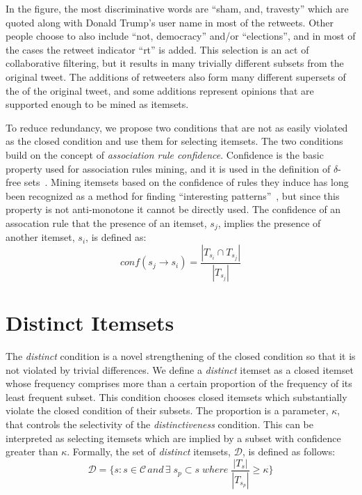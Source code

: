 \documentclass[letterpaper,12pt,titlepage,oneside,final]{book}
\begin{document}
In the figure, the most discriminative words are ``sham, and, travesty''
which are quoted along with Donald Trump's user name in most of the retweets.
Other people choose to also include ``not, democracy'' and/or ``elections'',
and in most of the cases the retweet indicator ``rt'' is added. 
This selection is an act of collaborative filtering,
but it results in many trivially different subsets from the original tweet.
The additions of retweeters also form many different supersets of the of the
original tweet, and some additions represent opinions that are supported
enough to be mined as itemsets. 

To reduce redundancy, we propose two conditions that are not as easily violated 
as the closed condition and use them for selecting itemsets.
The two conditions build on the concept of \emph{association rule confidence}.
Confidence is the basic property used for association rules mining,
and it is used in the definition of $\delta$-free sets~\cite{boulicaut2003free}.
Mining itemsets based on the confidence of rules they induce has long been
recognized as a method for finding
``interesting patterns''~\cite{cohen2001finding},
but since this property is not anti-monotone it cannot be directly used.
The confidence of an assocation rule that the presence of an itemset,
$s_{j}$, implies the presence of another itemset, $s_i$, is  defined as:
\begin{equation}\label{eq:conf}conf(s_j \rightarrow s_i) = \frac{|T_{s_i} \cap T_{s_j}|}{|T_{s_j}|}\end{equation}


\section{Distinct Itemsets}


The \emph{distinct} condition is a novel strengthening of the closed condition
so that it is not violated by trivial differences.
We define a \emph{distinct} itemset as a closed itemset whose frequency
comprises more than a certain proportion of the frequency of its least
frequent subset. 
This condition chooses closed itemsets which substantially violate the closed
condition of their subsets.
The proportion is a parameter, $\kappa$, that controls the selectivity of the
\emph{distinctiveness} condition.
This can be interpreted as selecting itemsets which are implied by a subset
with confidence greater than $\kappa$.
Formally, the set of \emph{distinct} itemsets, $\mathcal{D}$,
is defined as follows:
\begin{equation}\mathcal{D} = \{s: s \in \mathcal{C} \, and \, \exists \; s_{p} \subset s \; where \; \frac{|T_{s}|}{|T_{s_{p}}|} \ge \kappa 
\}\end{equation}
\end{document}

